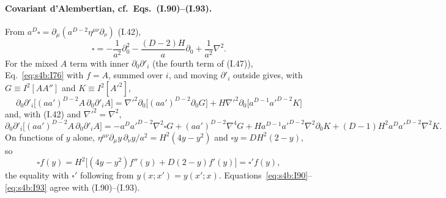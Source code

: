 \documentclass[aps,prd,onecolumn,10pt,nofootinbib,floatfix]{revtex4-2}
\newcommand{\eqI}[1]{(I.#1)}
\begin{document}
\paragraph*{Covariant d'Alembertian, cf.\ Eqs.~(I.90)--(I.93).}
From $a^D\square=\partial_\mu(a^{D-2}\eta^{\mu\nu}\partial_\nu)$ \eqI{42},
\begin{equation}
\square=-\frac{1}{a^2}\partial_0^2-\frac{(D-2)H}{a}\partial_0+\frac{1}{a^2}\nabla^2 .
\label{eq:s4b:I90}
\end{equation}
For the mixed $A$ term with inner $\partial_0\partial'_i$ (the fourth term of \eqI{47}), Eq.~\eqref{eq:s4b:I76} with $f=A$,
summed over $i$, and moving $\partial'_i$ outside gives, with $G\equiv I^2[AA'']$ and $K\equiv I^2[A'^2]$,
\begin{equation}
\partial_0\partial'_i\big[(aa')^{D-2}A\,\partial_0\partial'_iA\big]
=\nabla'^2\partial_0\big[(aa')^{D-2}\partial_0G\big]+H\nabla'^2\partial_0\big[a^{D-1}a'^{D-2}K\big]
\label{eq:s4b:I91}
\end{equation}
and, with \eqI{42} and $\nabla'^2=\nabla^2$,
\begin{equation}
\partial_0\partial'_i\big[(aa')^{D-2}A\,\partial_0\partial'_iA\big]
=-a^Da'^{D-2}\nabla^2\square G+(aa')^{D-2}\nabla^4G+Ha^{D-1}a'^{D-2}\nabla^2\partial_0K
+(D-1)H^2a^Da'^{D-2}\nabla^2K .
\label{eq:s4b:I92}
\end{equation}
On functions of $y$ alone, $\eta^{\mu\nu}\partial_\mu y\,\partial_\nu y/a^2=H^2(4y-y^2)$ and $\square y=DH^2(2-y)$, so
\begin{equation}
\square f(y)=H^2\big[(4y-y^2)f''(y)+D(2-y)f'(y)\big]=\square'f(y),
\label{eq:s4b:I93}
\end{equation}
the equality with $\square'$ following from $y(x;x')=y(x';x)$. Equations~\eqref{eq:s4b:I90}--\eqref{eq:s4b:I93} agree with
\eqI{90}--\eqI{93}.
\end{document}
